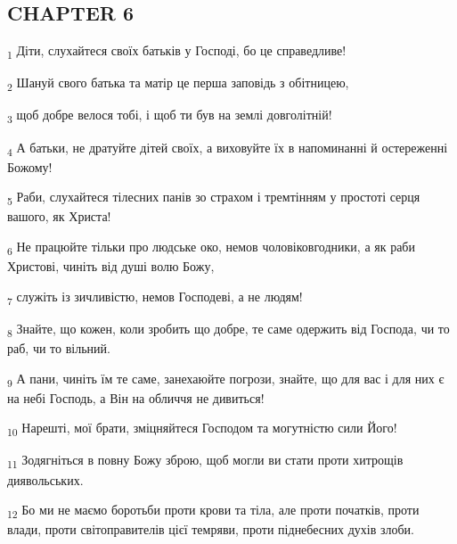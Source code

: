 \subsection{CHAPTER 6}
\begin{tcolorbox}
\textsubscript{1} Діти, слухайтеся своїх батьків у Господі, бо це справедливе!
\end{tcolorbox}
\begin{tcolorbox}
\textsubscript{2} Шануй свого батька та матір це перша заповідь з обітницею,
\end{tcolorbox}
\begin{tcolorbox}
\textsubscript{3} щоб добре велося тобі, і щоб ти був на землі довголітній!
\end{tcolorbox}
\begin{tcolorbox}
\textsubscript{4} А батьки, не дратуйте дітей своїх, а виховуйте їх в напоминанні й остереженні Божому!
\end{tcolorbox}
\begin{tcolorbox}
\textsubscript{5} Раби, слухайтеся тілесних панів зо страхом і тремтінням у простоті серця вашого, як Христа!
\end{tcolorbox}
\begin{tcolorbox}
\textsubscript{6} Не працюйте тільки про людське око, немов чоловіковгодники, а як раби Христові, чиніть від душі волю Божу,
\end{tcolorbox}
\begin{tcolorbox}
\textsubscript{7} служіть із зичливістю, немов Господеві, а не людям!
\end{tcolorbox}
\begin{tcolorbox}
\textsubscript{8} Знайте, що кожен, коли зробить що добре, те саме одержить від Господа, чи то раб, чи то вільний.
\end{tcolorbox}
\begin{tcolorbox}
\textsubscript{9} А пани, чиніть їм те саме, занехаюйте погрози, знайте, що для вас і для них є на небі Господь, а Він на обличчя не дивиться!
\end{tcolorbox}
\begin{tcolorbox}
\textsubscript{10} Нарешті, мої брати, зміцняйтеся Господом та могутністю сили Його!
\end{tcolorbox}
\begin{tcolorbox}
\textsubscript{11} Зодягніться в повну Божу зброю, щоб могли ви стати проти хитрощів диявольських.
\end{tcolorbox}
\begin{tcolorbox}
\textsubscript{12} Бо ми не маємо боротьби проти крови та тіла, але проти початків, проти влади, проти світоправителів цієї темряви, проти піднебесних духів злоби.
\end{tcolorbox}
